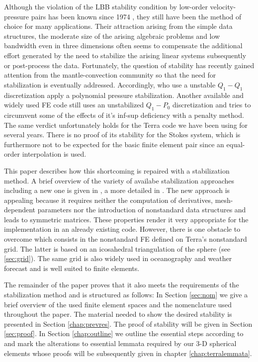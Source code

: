 \documentclass[times]{fldauth}
\newcommand{\sectionref}[1]{Section \ref{#1}}
\newcommand{\chapterref}[1]{chapter \ref{#1}}
\begin{document}
Although the violation of the LBB stability condition by low-order velocity-pressure pairs has been known since 1974 \cite{Brezzi1974existence},
they still have been the method of choice for many applications.
Their attraction arising from the simple data structures, the moderate size of the arising algebraic problems and low bandwidth even in three dimensions
often seems to compensate the additional effort generated by the need to stabilize the arising linear systems subsequently or post-process the data.
Fortunately, the question of stability has recently gained attention from the mantle-convection community so that the need for stabilization is eventually addressed. 
Accordingly, \cite{Burstedde2009} who use a unstable $Q_1-Q_1$ discretization apply a polynomial pressure stabilization.
Another available and widely used FE code \cite{Zhong2007a} still uses an unstabilized $Q_1-P_0$ discretization and tries to circumvent some of the effects of it's inf-sup deficiency with a penalty method.
The same verdict unfortunately holds for the Terra code we have been using for several years.
There is no proof of its stability for the Stokes system, which is furthermore not to be expected for the basic finite element pair since an equal-order interpolation is used. 

This paper describes how this shortcoming is repaired with a stabilization method. 
A brief overview of the variety of availabe stabilization approaches including a new one is given in \cite{bochev2007stabilization}, a more detailed in \cite{barth2004taxonomy}.
The new approach is appealing because it requires neither the computation of derivatives, mesh-dependent parameters nor the introduction of nonstandard data structures and leads to symmetric matrices. 
These properties render it very appropriate for the implementation in an already existing code.
%
However, there is one obstacle to overcome which consists in the nonstandard FE defined on Terra's nonstandard grid.   
The latter is based on an icosa\-hedral triangulation of the sphere \cite{Baumgardner1985,Baumgardner1985a} (see \ref{sec:grid}). 
The same grid is also widely used in oceano\-graphy \cite{Boal2008} and weather forecast \cite{Randall2002} and is well suited to finite elements.

The remainder of the paper proves that it also meets the requirements of the stabilization method  \cite{bochev2007stabilization} and is structured as follows:
In \sectionref{sec:nom} we  give a brief overview of the used finite element spaces and the nomenclature used throughout the paper.
The material needed to show the desired stability is presented in  \sectionref{chap:prevres}.
The proof of stability will be given in \sectionref{sec:proof}.
In \sectionref{chap:outline} we outline the essential steps according to \cite{bochev2007stabilization} and mark the alterations to essential lemmata
required by our 3-D spherical elements whose proofs will be subsequently given in \chapterref{chap:terralemmata}.
\end{document}
